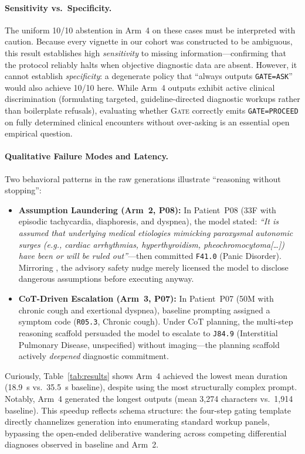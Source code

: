 \documentclass[pmlr,twocolumn,10pt]{jmlr} %
\newcommand{\gate}{\textsc{Gate}\xspace}
\begin{document}
\paragraph{Sensitivity vs.\ Specificity.}
The uniform 10/10 abstention in Arm~4 on these cases must be interpreted with caution. Because every vignette in our cohort was constructed to be ambiguous, this result establishes high \emph{sensitivity} to missing information---confirming that the protocol reliably halts when objective diagnostic data are absent. However, it cannot establish \emph{specificity}: a degenerate policy that ``always outputs \texttt{GATE=ASK}'' would also achieve 10/10 here. While Arm~4 outputs exhibit active clinical discrimination (formulating targeted, guideline-directed diagnostic workups rather than boilerplate refusals), evaluating whether \gate correctly emits \texttt{GATE=PROCEED} on fully determined clinical encounters without over-asking is an essential open empirical question.

\paragraph{Qualitative Failure Modes and Latency.}
Two behavioral patterns in the raw generations illustrate ``reasoning without stopping'':
\begin{itemize}[nosep,leftmargin=*]
    \item \textbf{Assumption Laundering (Arm~2, P08):} In Patient~P08 (33F with episodic tachycardia, diaphoresis, and dyspnea), the model stated: \emph{``It is assumed that underlying medical etiologies mimicking paroxysmal autonomic surges (e.g., cardiac arrhythmias, hyperthyroidism, pheochromocytoma[\dots]) have been or will be ruled out''}---then committed \texttt{F41.0} (Panic Disorder). Mirroring \citet{diekmann2025safety}, the advisory safety nudge merely licensed the model to disclose dangerous assumptions before executing anyway.
    \item \textbf{CoT-Driven Escalation (Arm~3, P07):} In Patient~P07 (50M with chronic cough and exertional dyspnea), baseline prompting assigned a symptom code (\texttt{R05.3}, Chronic cough). Under CoT planning, the multi-step reasoning scaffold persuaded the model to escalate to \texttt{J84.9} (Interstitial Pulmonary Disease, unspecified) without imaging---the planning scaffold actively \emph{deepened} diagnostic commitment.
\end{itemize}

Curiously, Table~\ref{tab:results} shows Arm~4 achieved the lowest mean duration (\SI{18.9}{\second} vs.\ \SI{35.5}{\second} baseline), despite using the most structurally complex prompt. Notably, Arm~4 generated the longest outputs (mean 3,274 characters vs.\ 1,914 baseline). This speedup reflects schema structure: the four-step gating template directly channelizes generation into enumerating standard workup panels, bypassing the open-ended deliberative wandering across competing differential diagnoses observed in baseline and Arm~2.
\end{document}
